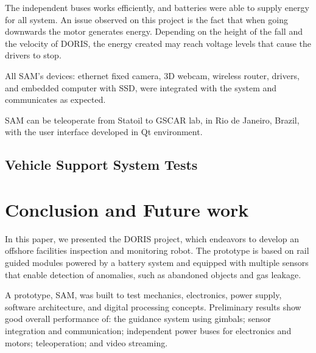 \documentclass{ifacconf}
\begin{document}
The independent buses works efficiently, and batteries were able to supply
energy for all system. An issue observed on this project
is the fact that when going downwards the motor generates energy. Depending on
the height of the fall and the velocity of DORIS, the energy created may reach
voltage levels that cause the drivers to stop.

All SAM's devices: ethernet fixed camera, 3D webcam, wireless router, drivers,
and embedded computer with SSD, were integrated with the system and communicates
as expected. 

SAM can be teleoperate from Statoil to GSCAR lab, in Rio de Janeiro, Brazil,
with the user interface developed in Qt environment.

\subsection{Vehicle Support System Tests}
\section{Conclusion and Future work}\label{sec:conclusions}

In this paper, we presented the DORIS project, which endeavors to develop an
offshore facilities inspection and monitoring robot. The prototype is based on
rail guided modules powered by a battery system and equipped with multiple
sensors that enable detection of anomalies, such as abandoned objects and gas
leakage. 

A prototype, SAM, was built to test mechanics, electronics, power
supply, software architecture, and digital processing concepts.
Preliminary results show good overall performance of: the guidance system using
gimbals; sensor integration and communication; independent power buses for
electronics and motors; teleoperation; and video streaming.

\end{document}
